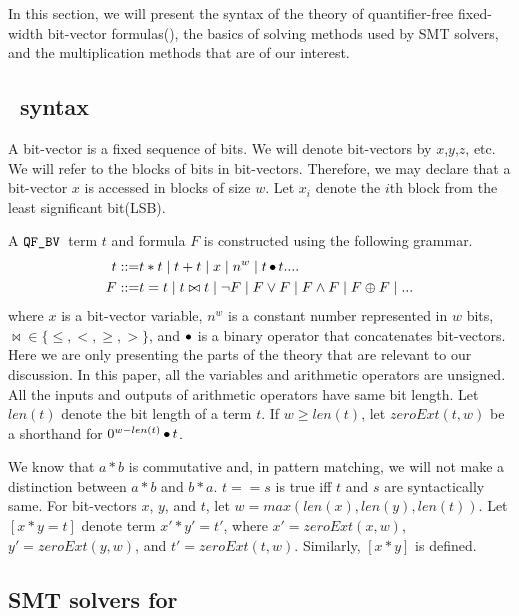 In this section, we will present the syntax of
the theory of quantifier-free fixed-width
bit-vector formulas(\qfbv),
the basics of solving methods used by SMT solvers,
and the multiplication methods that are of our interest. 

%

\subsection{\qfbv~syntax}

A bit-vector is a fixed sequence of bits.
%
We will denote bit-vectors by $x$,$y$,$z$, etc.
%
We will refer to the blocks of bits in bit-vectors.
%
Therefore, we may declare that a bit-vector $x$ is accessed in blocks
of size $w$.
%
Let $x_i$ denote the $i$th block from the least significant
bit(LSB).
%

A $\texttt{QF\_BV}$~term $t$ and formula $F$ is constructed using
the following grammar.
\begin{align*}
t ::= & t * t \mid t + t \mid x \mid n^w \mid t \mathop{\bullet} t  ....\\
F ::= & t = t \mid t \bowtie t \mid \lnot F \mid F \lor F \mid F \land F \mid F \oplus F \mid ... 
\end{align*}
where $x$ is a bit-vector variable, 
$n^w$ is a constant number represented in $w$ bits,
$\bowtie \in \{\leq , <, \geq, > \}$, and
$\mathop{\bullet}$ is a binary operator that concatenates bit-vectors.
%
Here we are only presenting the parts of the theory
that are relevant to our discussion.
%
In this paper, all the variables and arithmetic operators are unsigned.
%
All the inputs and outputs of arithmetic operators 
have same bit length.
%
Let $len(t)$ denote the bit length of a term $t$.
%
If $w \geq len(t)$,
let $zeroExt(t,w)$ be a shorthand for  $0^{w-len(t)}\mathop{\bullet} t$.

We know that $a * b$ is commutative and, in pattern matching,
we will not make a distinction between $a*b$ and $b*a$.
%
$t == s$ is true iff $t$ and $s$ are syntactically same.
%
For bit-vectors $x$, $y$, and $t$, let $w= max( len(x),len(y), len(t))$.
%
Let $[x*y = t]$ denote term $x'*y'=t'$, where 
$x' = zeroExt(x,w)$, $y' = zeroExt(y,w)$, and $t' = zeroExt(t,w)$.
%
Similarly, $[x*y]$ is defined.

\subsection{SMT solvers for \qfbv}

